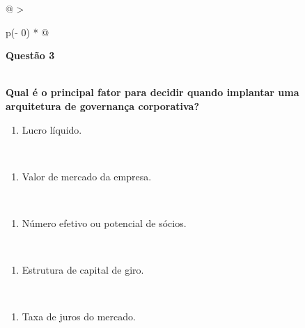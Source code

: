 \documentclass[
]{book}
\providecommand{\tightlist}{%
  \setlength{\itemsep}{0pt}\setlength{\parskip}{0pt}}
\begin{document}
\begin{longtable}[]{@{}
  >{\raggedright\arraybackslash}p{(\columnwidth - 0\tabcolsep) * }@{}}
\toprule\noalign{}
\begin{minipage}[b]{\linewidth}\raggedright
\textbf{Questão 3}
\end{minipage} \\
\midrule\noalign{}
\endhead
\bottomrule\noalign{}
\endlastfoot
\textbf{Qual é o principal fator para decidir quando implantar uma arquitetura de governança corporativa?} \\
\begin{minipage}[t]{\linewidth}\raggedright
\begin{enumerate}
\def\labelenumi{\alph{enumi})}
\tightlist
\item
  Lucro líquido.
\end{enumerate}
\end{minipage} \\
\begin{minipage}[t]{\linewidth}\raggedright
\begin{enumerate}
\def\labelenumi{\alph{enumi})}
\setcounter{enumi}{1}
\tightlist
\item
  Valor de mercado da empresa.
\end{enumerate}
\end{minipage} \\
\begin{minipage}[t]{\linewidth}\raggedright
\begin{enumerate}
\def\labelenumi{\alph{enumi})}
\setcounter{enumi}{2}
\tightlist
\item
  Número efetivo ou potencial de sócios.
\end{enumerate}
\end{minipage} \\
\begin{minipage}[t]{\linewidth}\raggedright
\begin{enumerate}
\def\labelenumi{\alph{enumi})}
\setcounter{enumi}{3}
\tightlist
\item
  Estrutura de capital de giro.
\end{enumerate}
\end{minipage} \\
\begin{minipage}[t]{\linewidth}\raggedright
\begin{enumerate}
\def\labelenumi{\alph{enumi})}
\setcounter{enumi}{4}
\tightlist
\item
  Taxa de juros do mercado.
\end{enumerate}
\end{minipage} \\
\end{longtable}
\end{document}
